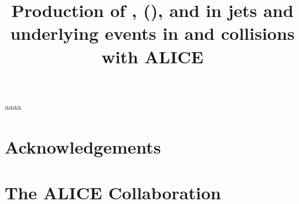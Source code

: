 \documentclass[ALICE,manyauthors]{cernphprep}
\begin{document}
\begin{titlepage}

\title{Production of \kzero, \lmb (\almb), \Xis and \Oms in jets and underlying events in \pp and \pPb collisions with ALICE}



\end{titlepage}

\setcounter{page}{2}





aaaa

\clearpage
\newenvironment{acknowledgement}{\relax}{\relax}
\begin{acknowledgement}
\section*{Acknowledgements}
%

\end{acknowledgement}




\newpage
\appendix

\section{The ALICE Collaboration}
\label{app:collab}
%  
\end{document}
